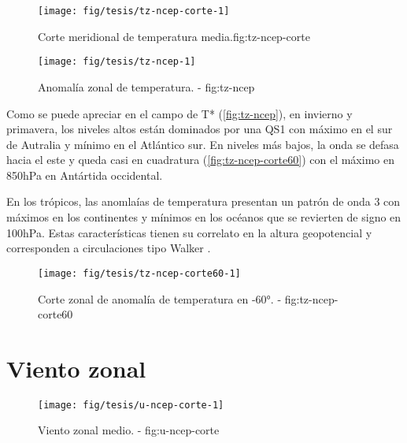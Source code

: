 \documentclass[spanish,a4paper]{book}
\begin{document}
\begin{figure}

{\centering \texttt{[image: fig/tesis/tz-ncep-corte-1]} 

}

\caption{Corte meridional de temperatura media.{fig:tz-ncep-corte}}\label{fig:tz-ncep-corte}
\end{figure}

\begin{figure}

{\centering \texttt{[image: fig/tesis/tz-ncep-1]} 

}

\caption{Anomalía zonal de temperatura. - fig:tz-ncep}\label{fig:tz-ncep}
\end{figure}

Como se puede apreciar en el campo de T* (\autoref{fig:tz-ncep}), en
invierno y primavera, los niveles altos están dominados por una QS1 con
máximo en el sur de Autralia y mínimo en el Atlántico sur. En niveles
más bajos, la onda se defasa hacia el este y queda casi en cuadratura
(\autoref{fig:tz-ncep-corte60}) con el máximo en 850hPa en Antártida
occidental.


En los trópicos, las anomlaías de temperatura presentan un patrón de
onda 3 con máximos en los continentes y mínimos en los océanos que se
revierten de signo en 100hPa. Estas características tienen su correlato
en la altura geopotencial y corresponden a circulaciones tipo Walker
.

\begin{figure}

{\centering \texttt{[image: fig/tesis/tz-ncep-corte60-1]} 

}

\caption{Corte zonal de anomalía de temperatura en -60°. - fig:tz-ncep-corte60}\label{fig:tz-ncep-corte60}
\end{figure}

\section{Viento zonal}\label{viento-zonal}

\begin{figure}

{\centering \texttt{[image: fig/tesis/u-ncep-corte-1]} 

}

\caption{Viento zonal medio. - fig:u-ncep-corte}\label{fig:u-ncep-corte}
\end{figure}
\end{document}
